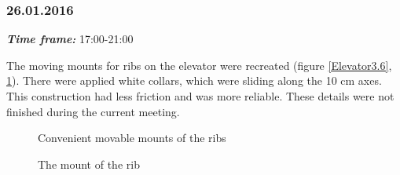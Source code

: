 \subsubsection{26.01.2016}
\textit{\textbf{Time frame:}} 17:00-21:00

The moving mounts for ribs on the elevator were recreated (figure \ref{Elevator3.6}, \ref{Elevator3.7}). There were applied white collars, which were sliding along the 10 cm axes. This construction had less friction and was more reliable. These details were not finished during the current meeting.

\begin{figure}[H]
	\begin{minipage}[h]{0.47\linewidth}
		\caption{Convenient movable mounts of the ribs}
		\label{Elevator3.6}
	\end{minipage}
	\hfill
	\begin{minipage}[h]{0.47\linewidth}
		\caption{The mount of the rib}
		\label{Elevator3.7}
	\end{minipage}
\end{figure}


